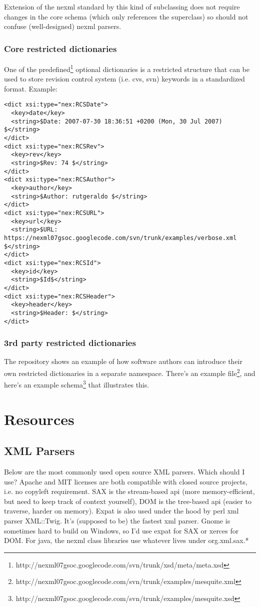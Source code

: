 \documentclass{article}
\begin{document}
Extension of the nexml standard by this kind of subclassing does not require changes in the core schema (which only references the 
superclass) so should not confuse (well-designed) nexml parsers.

\subsubsection{Core restricted dictionaries}
One of the predefined\footnote{http://nexml07gsoc.googlecode.com/svn/trunk/xsd/meta/meta.xsd} optional dictionaries is a 
restricted structure that can be used to store revision control system (i.e. cvs, svn) keywords in a standardized format. Example:
\begin{verbatim}
<dict xsi:type="nex:RCSDate">
  <key>date</key>
  <string>$Date: 2007-07-30 18:36:51 +0200 (Mon, 30 Jul 2007) $</string>
</dict>
<dict xsi:type="nex:RCSRev">
  <key>rev</key>
  <string>$Rev: 74 $</string>
</dict>
<dict xsi:type="nex:RCSAuthor">
  <key>author</key>
  <string>$Author: rutgeraldo $</string>
</dict>
<dict xsi:type="nex:RCSURL">
  <key>url</key>
  <string>$URL: https://nexml07gsoc.googlecode.com/svn/trunk/examples/verbose.xml $</string>
</dict>
<dict xsi:type="nex:RCSId">
  <key>id</key>
  <string>$Id$</string>
</dict>
<dict xsi:type="nex:RCSHeader">
  <key>header</key>
  <string>$Header: $</string>
</dict>
\end{verbatim}

\subsubsection{3rd party restricted dictionaries}

The repository shows an example of how software authors can introduce their own restricted dictionaries in a separate namespace. There's 
an example file\footnote{http://nexml07gsoc.googlecode.com/svn/trunk/examples/mesquite.xml}, and here's an 
example schema\footnote{http://nexml07gsoc.googlecode.com/svn/trunk/examples/mesquite.xsd} that illustrates this.

\section{Resources}

\subsection{XML Parsers}
Below are the most commonly used open source XML parsers. Which should I use? Apache and MIT licenses are both compatible with 
closed source projects, i.e. no copyleft requirement. SAX is the stream-based api (more memory-efficient, but need to keep track 
of context yourself), DOM is the tree-based api (easier to traverse, harder on memory). Expat is also used under the hood by perl 
xml parser XML::Twig. It's (supposed to be) the fastest xml parser. Gnome is sometimes hard to build on Windows, so I'd use expat 
for SAX or xerces for DOM. For java, the nexml class libraries use whatever lives under org.xml.sax.*
\end{document}
